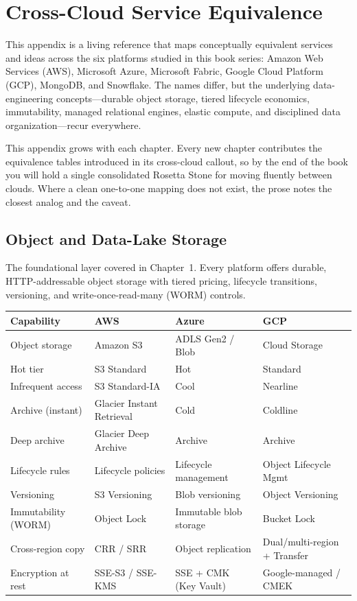 \chapter{Cross-Cloud Service Equivalence}
%
This appendix is a living reference that maps conceptually equivalent services and
ideas across the six platforms studied in this book series: Amazon Web Services
(AWS), Microsoft Azure, Microsoft Fabric, Google Cloud Platform (GCP), MongoDB, and
Snowflake. The names differ, but the underlying data-engineering concepts---durable
object storage, tiered lifecycle economics, immutability, managed relational engines,
elastic compute, and disciplined data organization---recur everywhere.

\begin{notebox}
This appendix grows with each chapter. Every new chapter contributes the equivalence
tables introduced in its cross-cloud callout, so by the end of the book you will hold
a single consolidated Rosetta Stone for moving fluently between clouds. Where a clean
one-to-one mapping does not exist, the prose notes the closest analog and the caveat.
\end{notebox}

\section{Object and Data-Lake Storage}
%
The foundational layer covered in Chapter~1. Every platform offers durable, HTTP-addressable
object storage with tiered pricing, lifecycle transitions, versioning, and write-once-read-many
(WORM) controls.

\begin{center}
\footnotesize
\begin{tabular}{@{}p{2.8cm}p{3.2cm}p{3.2cm}p{3.2cm}@{}}
\toprule
\textbf{Capability} & \textbf{AWS} & \textbf{Azure} & \textbf{GCP} \\
\midrule
Object storage & Amazon S3 & ADLS Gen2 / Blob & Cloud Storage \\
Hot tier & S3 Standard & Hot & Standard \\
Infrequent access & S3 Standard-IA & Cool & Nearline \\
Archive (instant) & Glacier Instant Retrieval & Cold & Coldline \\
Deep archive & Glacier Deep Archive & Archive & Archive \\
Lifecycle rules & Lifecycle policies & Lifecycle management & Object Lifecycle Mgmt \\
Versioning & S3 Versioning & Blob versioning & Object Versioning \\
Immutability (WORM) & Object Lock & Immutable blob storage & Bucket Lock \\
Cross-region copy & CRR / SRR & Object replication & Dual/multi-region + Transfer \\
Encryption at rest & SSE-S3 / SSE-KMS & SSE + CMK (Key Vault) & Google-managed / CMEK \\
\bottomrule
\end{tabular}
\end{center}


